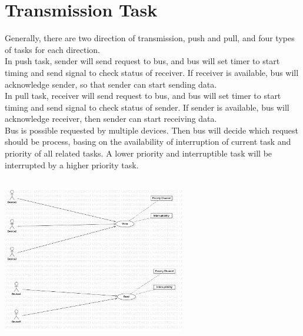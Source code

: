 \documentclass[12pt,article]{memoir}
\begin{document}
\chapter{Transmission Task}
Generally, there are two direction of transmission, push and pull, and four types of tasks for each direction.\\
In push task, sender will send request to bus, and bus will set timer to start timing and send signal to check status of receiver. If receiver is available, bus will acknowledge sender, so that sender can start sending data.\\
In pull task, receiver will send request to bus, and bus will set timer to start timing and send signal to check status of sender. If sender is available, bus will acknowledge receiver, then sender can start receiving data.\\
Bus is possible requested by multiple devices. Then bus will decide which request should be process, basing on the availability of interruption of current task and priority of all related tasks. A lower priority and interruptible task will be interrupted by a higher priority task.\\
\includegraphics[width=8cm,height=8cm]{img/DR00012_Use_Case.jpg}

\newpage
\end{document}
